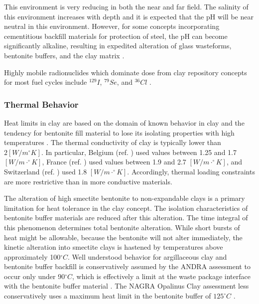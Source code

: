 This environment is very reducing in both the near and far field.
The salinity of this environment increases with depth and it is 
expected that the pH will be near neutral in this environment. However, for 
some concepts incorporating cementitious backfill materials for protection 
of steel, the pH can become significantly alkaline, resulting in 
expedited alteration of glass wasteforms, bentonite buffers, and the clay 
matrix \cite{andra_argile:_2005}.


Highly mobile radionuclides which dominate dose from clay repository concepts 
for most fuel cycles include $^{129}I$, $^{79}Se$, and $^{36}Cl$ 
\cite{swift_applying_2010}. 

\subsubsection{Thermal Behavior}
\label{subsec:claythermal}


Heat limits in clay are based on the domain of known behavior in clay and the 
tendency for bentonite fill material to lose its isolating properties with high 
temperatures \cite{andra_argile:_2005, pusch_alteration_1987}. 
The thermal conductivity of clay is typically lower than 
$2[W/m^{\circ}K]$. In particular, Belgium (ref. 
\cite{ondraf-niras_technical_2001}) 
used values between 1.25 and 1.7 $[W/m\cdot^{\circ}K]$,
France (ref. \cite{andra_argile:_2005}) used values between 1.9 and 2.7 
$[W/m\cdot^{\circ}K]$, and Switzerland (ref. \cite{johnson_calculations_2002}) used 1.8 $[W/m\cdot^{\circ}K]$.
Accordingly, thermal loading constraints are more restrictive than in more 
conductive materials. 

The alteration of high smectite bentonite to non-expandable clays is a primary 
limitation for heat tolerance in the clay concept. The isolation characteristics 
of bentonite buffer materials are reduced after this alteration. The time 
integral of this phenomenon determines total bentonite alteration. While short 
bursts of heat might be allowable, because the bentonite will not alter 
immediately, the kinetic alteration into smectite clays is hastened by 
temperatures above approximately 100$^{\circ}C$\cite{pusch_alteration_1987}. 
Well understood behavior for argillaceous clay and bentonite buffer backfill
is conservatively assumed by the \gls{ANDRA} assessment to occur only under  
90$^{\circ}C$, which is effectively a limit at the waste package interface with 
the bentonite buffer material\cite{andra_argile:_2005} .
The \gls{NAGRA} Opalinus Clay assessment less conservatively 
uses a maximum heat limit in the bentonite buffer of $125^{\circ}C$
\cite{johnson_project_2002} .

